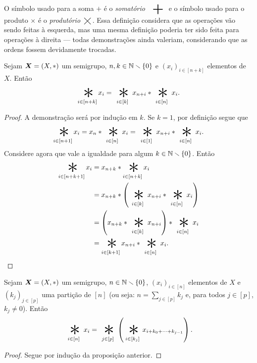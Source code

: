 O símbolo usado para a soma $+$ é o \emph{somatório} $\displaystyle\bigplus$ e o símbolo usado para o produto $\times$ é o \emph{produtório} $\displaystyle\bigtimes$. Essa definição considera que as operações vão sendo feitas à esquerda, mas uma mesma definição poderia ter sido feita para operações à direita --- todas demonstrações ainda valeriam, considerando que as ordens fossem devidamente trocadas.

\begin{proposition}
Sejam $\bm X=(X,\ast)$ um semigrupo, $n,k \in \mathbb{N} \smallsetminus \{0\}$ e $(x_i)_{i \in [n+k]}$ elementos de $X$. Então
	\begin{equation*}
	\bigopb_{i \in [n+k]} x_i = \bigopb_{i \in [k]} x_{n+i} \opb \bigopb_{i \in [n]} x_i.
	\end{equation*}
\end{proposition}
\begin{proof}
A demonstração será por indução em $k$. Se $k=1$, por definição segue que
	\begin{equation*}
	\bigopb_{i \in [n+1]} x_i = x_{n} \opb \displaystyle \bigopb_{i \in [n]} x_i = \bigopb_{i \in [1]} x_{n+i} \opb \bigopb_{i \in [n]} x_i.
	\end{equation*}
Considere agora que vale a igualdade para algum $k \in \mathbb{N} \smallsetminus \{0\}$. Então
	\begin{align*}
	\bigopb_{i \in [n+k+1]} x_i
		&= x_{n+k} \opb \bigopb_{i \in [n+k]} x_i \\
		&= x_{n+k} \opb \left(\bigopb_{i \in [k]} x_{n+i} \opb \bigopb_{i \in [n]} x_i\right) \\
		&= \left(x_{n+k} \opb \bigopb_{i \in [k]} x_{n+i} \right) \opb \bigopb_{i \in [n]} x_i \\
		&= \bigopb_{i \in [k+1]} x_{n+i} \opb \bigopb_{i \in [n]} x_i. \qedhere
	\end{align*}
\end{proof}

\begin{proposition}
Sejam $\bm X=(X,\ast)$ um semigrupo, $n \in \mathbb{N} \smallsetminus \{0\}$, $(x_i)_{i \in [n]}$ elementos de $X$ e $(k_j)_{j \in [p]}$ uma partição de $[n]$ (ou seja: $n = \sum_{j \in [p]} k_j$ e, para todos $j \in [p]$, $k_j \neq 0$). Então
	\begin{equation*}
	\bigopb_{i \in [n]} x_i = \bigopb_{j \in [p]}\left(\bigopb_{i \in [k_j]} x_{i + k_0 + \cdots + k_{j-1}}\right).
	\end{equation*}
\end{proposition}
\begin{proof}
Segue por indução da proposição anterior.
\end{proof}

